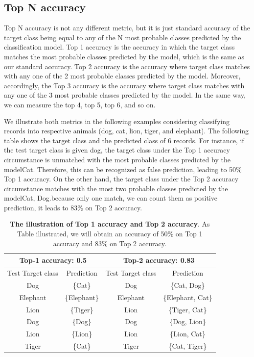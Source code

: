 \subsection{Top N accuracy }
Top N accuracy is not any different metric, but it is just standard accuracy of the target class being equal to any of the N most probable classes predicted by the classification model. Top 1 accuracy is the accuracy in which the target class matches the most probable classes predicted by the model, which is the same as our standard accuracy. Top 2 accuracy is the accuracy where target class matches with any one of the 2 most probable classes predicted by the model. Moreover, accordingly, the Top 3 accuracy is the accuracy where target class matches with any one of the 3 most probable classes predicted by the model. In the same way, we can measure the top 4, top 5, top 6, and so on.


We illustrate both metrics in the following examples considering classifying records into respective animals (dog, cat, lion, tiger, and elephant). The following table shows the target class and the predicted class of 6 records.
For instance, if the test target class is given dog, the target class under the Top 1 accuracy circumstance is unmatched with the most probable classes predicted by the model{Cat}. Therefore, this can be recognized as false prediction, leading to 50\% Top 1 accuracy.
On the other hand, the target class under the Top 2 accuracy circumstance matches with the most two probable classes predicted by the model{Cat, Dog}.because only one match, we can count them as positive prediction, it leads to 83\% on Top  2  accuracy.
\begin{table}[h]
\centering

\begin{tabular}{@{}cccc@{}}

\toprule
\multicolumn{2}{c}{Top-1 accuracy: 0.5} & \multicolumn{2}{c}{Top-2 accuracy: 0.83} \\ \midrule
Test Target class    & Prediction      & Test Target class   & Prediction         \\
Dog                  & \{Cat\}         & Dog                 & \{Cat, Dog\}       \\
Elephant             & \{Elephant\}    & Elephant            & \{Elephant, Cat\}  \\
Lion                 & \{Tiger\}       & Lion                & \{Tiger, Cat\}     \\
Dog                  & \{Dog\}         & Dog                 & \{Dog, Lion\}      \\
Lion                 & \{Lion\}        & Lion                & \{Lion, Cat\}      \\
Tiger                & \{Cat\}         & Tiger               & \{Cat, Tiger\}     \\ \bottomrule


\end{tabular}

\caption{\textbf{The illustration of Top 1 accuracy and Top 2 accuracy}. As Table illustrated, we will obtain an accuracy of 50\% on Top 1 accuracy and 83\% on Top 2 accuracy. }
\end{table}


